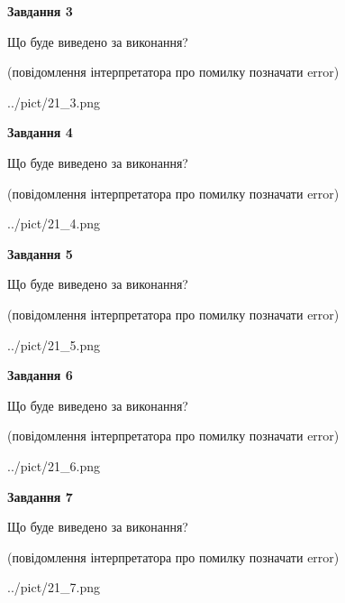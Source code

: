 \documentclass[12pt, ukrainian]{article}
\begin{document}
{\begin {large}
{\begin {center}\textbf{Завдання 3}\end {center}}\par
Що буде виведено за виконання?\par
 (повідомлення інтерпретатора про помилку позначати error)\par
\begin{center}
	{../pict/21_3.png}
\end{center}
\newpage

{\begin {center}\textbf{Завдання 4}\end {center}}\par
Що буде виведено за виконання?\par
 (повідомлення інтерпретатора про помилку позначати error)\par
\begin{center}
	{../pict/21_4.png}
\end{center}
\newpage

{\begin {center}\textbf{Завдання 5}\end {center}}\par
Що буде виведено за виконання?\par
 (повідомлення інтерпретатора про помилку позначати error)\par
\begin{center}
	{../pict/21_5.png}
\end{center}
\newpage

{\begin {center}\textbf{Завдання 6}\end {center}}\par
Що буде виведено за виконання?\par
 (повідомлення інтерпретатора про помилку позначати error)\par
\begin{center}
	{../pict/21_6.png}
\end{center}
\newpage

{\begin {center}\textbf{Завдання 7}\end {center}}\par
Що буде виведено за виконання?\par
 (повідомлення інтерпретатора про помилку позначати error)\par
\begin{center}
	{../pict/21_7.png}
\end{center}
\newpage


\end{large}}
\end{document}
